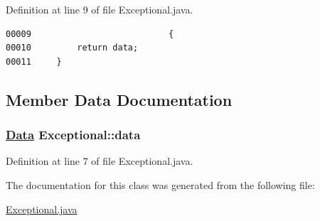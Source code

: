 Definition at line 9 of file Exceptional.java.\footnotesize\begin{verbatim}00009                           {
00010         return data;
00011     }
\end{verbatim}\normalsize 


\subsection{Member Data Documentation}
\hypertarget{classExceptional_o0}{
\subsubsection[data]{\setlength{\rightskip}{0pt plus 5cm}\hyperlink{interfaceData}{Data} Exceptional::data}}
\label{classExceptional_o0}




Definition at line 7 of file Exceptional.java.

The documentation for this class was generated from the following file:\begin{CompactItemize}
\item 
\hyperlink{Exceptional_8java-source}{Exceptional.java}\end{CompactItemize}
